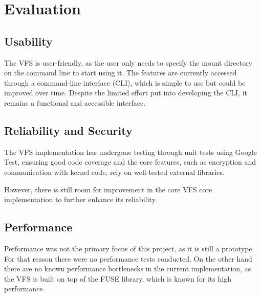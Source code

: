 
\section{Evaluation}\label{sec:evaluation}


\subsection{Usability}\label{subsec:usability}

The VFS is user-friendly, as the user only needs to specify the mount directory on the command line to start using it.
The features are currently accessed through a command-line interface (CLI), which is simple to use but could be improved over time.
Despite the limited effort put into developing the CLI, it remains a functional and accessible interface.

\subsection{Reliability and Security}\label{subsec:reliability-and-security}

The VFS implementation has undergone testing through unit tests using Google Test, ensuring good code coverage and the core features, such as encryption and communication with kernel code, rely on well-tested external libraries.

However, there is still room for improvement in the core VFS core implementation to further enhance its reliability.

\subsection{Performance}\label{subsec:performance}

Performance was not the primary focus of this project, as it is still a prototype.
For that reason there were no performance tests conducted.
On the other hand there are no known performance bottlenecks in the current implementation, as the VFS is built on top of the FUSE library, which is known for its high performance.
